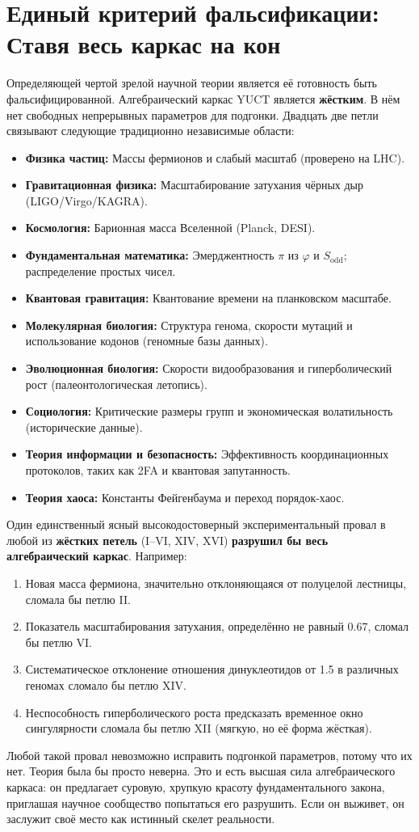 \documentclass[12pt,a4paper]{article}
\begin{document}
	\section*{Единый критерий фальсификации: Ставя весь каркас на кон}
	
	Определяющей чертой зрелой научной теории является её готовность быть фальсифицированной. Алгебраический каркас YUCT является \textbf{жёстким}. В нём нет свободных непрерывных параметров для подгонки. Двадцать две петли связывают следующие традиционно независимые области:
	\begin{itemize}
		\item \textbf{Физика частиц:} Массы фермионов и слабый масштаб (проверено на LHC).
		\item \textbf{Гравитационная физика:} Масштабирование затухания чёрных дыр (LIGO/Virgo/KAGRA).
		\item \textbf{Космология:} Барионная масса Вселенной (Planck, DESI).
		\item \textbf{Фундаментальная математика:} Эмерджентность \(\pi\) из \(\varphi\) и \(S_{\mathrm{odd}}\); распределение простых чисел.
		\item \textbf{Квантовая гравитация:} Квантование времени на планковском масштабе.
		\item \textbf{Молекулярная биология:} Структура генома, скорости мутаций и использование кодонов (геномные базы данных).
		\item \textbf{Эволюционная биология:} Скорости видообразования и гиперболический рост (палеонтологическая летопись).
		\item \textbf{Социология:} Критические размеры групп и экономическая волатильность (исторические данные).
		\item \textbf{Теория информации и безопасность:} Эффективность координационных протоколов, таких как 2FA и квантовая запутанность.
		\item \textbf{Теория хаоса:} Константы Фейгенбаума и переход порядок-хаос.
	\end{itemize}
	Один единственный ясный высокодостоверный экспериментальный провал в любой из \textbf{жёстких петель} (I–VI, XIV, XVI) \textbf{разрушил бы весь алгебраический каркас}. Например:
	\begin{enumerate}
		\item Новая масса фермиона, значительно отклоняющаяся от полуцелой лестницы, сломала бы петлю II.
		\item Показатель масштабирования затухания, определённо не равный \(0.67\), сломал бы петлю VI.
		\item Систематическое отклонение отношения динуклеотидов от 1.5 в различных геномах сломало бы петлю XIV.
		\item Неспособность гиперболического роста предсказать временное окно сингулярности сломала бы петлю XII (мягкую, но её форма жёсткая).
	\end{enumerate}
	Любой такой провал невозможно исправить подгонкой параметров, потому что их нет. Теория была бы просто неверна. Это и есть высшая сила алгебраического каркаса: он предлагает суровую, хрупкую красоту фундаментального закона, приглашая научное сообщество попытаться его разрушить. Если он выживет, он заслужит своё место как истинный скелет реальности.
	
\end{document}
